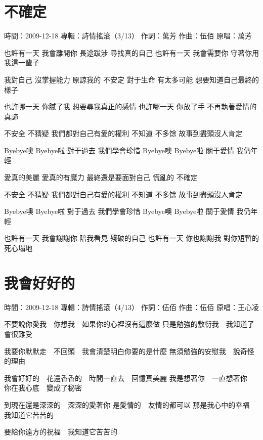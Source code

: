 \documentclass[UTF8,a4paper,oneside,twocolumn,12pt]{ctexbook}
\newcommand{\infopair}[2]{\textbullet #1：#2}
\newcommand{\zc}[1][伍佰]{\infopair{作詞}{#1}}
\newcommand{\zq}[1][伍佰]{\infopair{作曲}{#1}}
\newcommand{\zj}[1]{\infopair{專輯}{#1}}
\newcommand{\yc}[1]{\infopair{原唱}{#1}}
\newcommand{\sj}[1]{\infopair{時間}{#1}}
\newenvironment{info}{\begin{flushleft}\kaishu
	}
	{\end{flushleft}\normalsize\yahei\par}
\newenvironment{lyric}{
	}
{}
\begin{document}
\section{不確定}
\begin{info}
	\sj{2009-12-18}
	\zj{詩情搖滾（3/13）}
	\zc[萬芳]
	\zq
	\yc{萬芳}
\end{info}
\begin{lyric}
	也許有一天 我會離開你
	長途跋涉 尋找真的自己
	也許有一天 我會需要你
	守著你用我這一輩子

	我對自己 沒掌握能力
	原諒我的 不安定
	對于生命 有太多可能
	想要知道自己最終的樣子

	也許哪一天 你膩了我
	想要尋我真正的感情
	也許哪一天 你放了手
	不再執著愛情的真諦

	不安全 不猜疑
	我們都對自己有愛的權利
	不知道 不多馀
	故事到盡頭沒人肯定

	Byebye噢 Byebye啦
	對于過去 我們學會珍惜
	Byebye噢 Byebye啦
	關于愛情 我仍年輕

	愛真的美麗 愛真的有魔力
	最終還是要面對自己
	慌亂的 不確定

	不安全 不猜疑
	我們都對自己有愛的權利
	不知道 不多馀
	故事到盡頭沒人肯定

	Byebye噢 Byebye啦
	對于過去 我們學會珍惜
	Byebye噢 Byebye啦
	關于愛情 我仍年輕

	也許有一天 我會謝謝你
	陪我看見 殘破的自己
	也許有一天 你也謝謝我
	對你短暫的死心塌地
\end{lyric}

\section{我會好好的}
\begin{info}
	\sj{2009-12-18}
	\zj{詩情搖滾（4/13）}
	\zc
	\zq
	\yc{王心凌}
\end{info}
\begin{lyric}
	不要說你愛我　你想我　如果你的心裡沒有這麼做
	只是勉強的敷衍我　我知道了會很難受

	我要你默默走　不回頭　我會清楚明白你要的是什麼
	無須勉強的安慰我　說奇怪的理由

	我會好好的　花還香香的　時間一直去　回憶真美麗
	我是想著你　一直想著你　你在我心底　變成了秘密

	到現在還是深深的　深深的愛著你
	是愛情的　友情的都可以
	那是我心中的幸福　我知道它苦苦的

	要給你遠方的祝福　我知道它苦苦的
\end{lyric}
\end{document}
